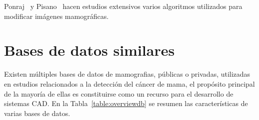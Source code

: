 
Ponraj~\cite{ponraj2011survey} y Pisano~\cite{pisano2000image} hacen estudios
extensivos varios algoritmos utilizados para modificar imágenes mamográficas.

\section{Bases de datos similares}

Existen múltiples bases de datos de mamografias, públicas o privadas,
utilizadas en estudios relacionados a la detección del cáncer de mama, el
propósito principal de la mayoría de ellas es constituirse como un recurso para
el desarrollo de sistemas CAD. En la Tabla~\ref{table:overviewdb} se resumen
las características de varias bases de datos.

